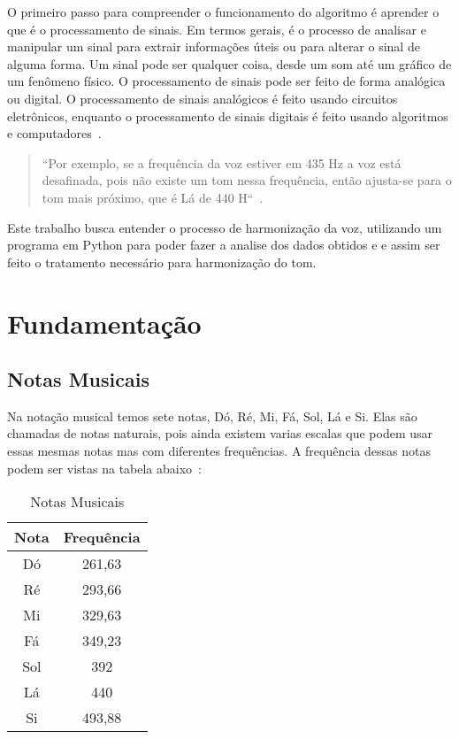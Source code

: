 \documentclass{sbrt}
\begin{document}
O primeiro passo para compreender o funcionamento do algoritmo é aprender o que é o processamento de sinais. Em termos gerais, é o processo de analisar e manipular um sinal para extrair informações úteis ou para alterar o sinal de alguma forma. Um sinal pode ser qualquer coisa, desde um som até um gráfico de um fenômeno físico. O processamento de sinais pode ser feito de forma analógica ou digital. O processamento de sinais analógicos é feito usando circuitos eletrônicos, enquanto o processamento de sinais digitais é feito usando algoritmos e computadores~\cite{prandoni2008signal}.

\begin{quote} ``Por exemplo, se a frequência da voz estiver em 435 Hz a voz está desafinada, pois não existe um tom nessa frequência, então ajusta-se para o tom mais próximo, que é Lá de 440 H``~\cite{deimplementaccao}. \end{quote}

Este trabalho busca entender o processo de harmonização da voz, utilizando um programa em Python para poder fazer a analise dos dados obtidos e e assim ser feito o tratamento necessário para harmonização do tom.


\section{Fundamentação}

\subsection{Notas Musicais}

Na notação musical temos sete notas, Dó, Ré, Mi, Fá, Sol, Lá e Si. Elas são chamadas de notas naturais, pois ainda existem varias escalas que podem usar essas mesmas notas mas com diferentes frequências. A frequência dessas notas podem ser vistas na tabela abaixo~\cite{moretti2003prototipo}:

\begin{table}[h]
\centering
\caption{Notas Musicais}
\vspace{-0.2cm}
\begin{tabular}{c|c}
Nota & Frequência \\
\hline
Dó &261,63 \\
Ré &293,66 \\
Mi &329,63 \\
Fá &349,23 \\
Sol &392 \\
Lá &440 \\
Si &493,88
\end{tabular}
\end{table}
\end{document}
